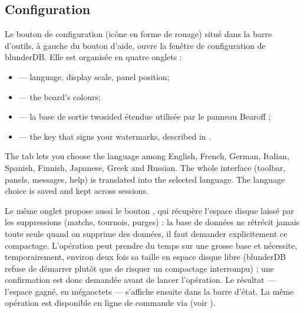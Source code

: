 \documentclass[letterpaper,10pt,english]{sphinxmanual}
\begin{document}
\subsection{Configuration}
\label{\detokenize{manuel:configuration}}\label{\detokenize{manuel:id2}}
\sphinxAtStartPar
Le bouton de configuration (icône en forme de rouage) situé dans la barre
d’outils, à gauche du bouton d’aide, ouvre la fenêtre de configuration de
blunderDB. Elle est organisée en quatre onglets :
\begin{itemize}
\item {} 
\sphinxAtStartPar
{} — language, display scale, panel position;

\item {} 
\sphinxAtStartPar
{} — the board’s colours;

\item {} 
\sphinxAtStartPar
{} — la base de sortie two\sphinxhyphen{}sided étendue utilisée par le panneau
Bearoff ;

\item {} 
\sphinxAtStartPar
{} — the key that signs your watermarks, described in {\hyperref[\detokenize{manuel:diffusion-controlee}]{}}.

\end{itemize}

\sphinxAtStartPar
The  tab lets you choose the language among English, French, German, Italian, Spanish, Finnish, Japanese, Greek and Russian. The whole interface (toolbar, panels, messages, help) is translated into the selected language. The language choice is saved and kept across sessions.

\sphinxAtStartPar
Le même onglet propose aussi le bouton , qui récupère
l’espace disque laissé par les suppressions (matchs, tournois, purges) : la
base de données ne rétrécit jamais toute seule quand on supprime des données,
il faut demander explicitement ce compactage. L’opération peut prendre du
temps sur une grosse base et nécessite, temporairement, environ deux fois sa
taille en espace disque libre (blunderDB refuse de démarrer plutôt que de
risquer un compactage interrompu) ; une confirmation est donc demandée avant
de lancer l’opération. Le résultat — l’espace gagné, en mégaoctets — s’affiche
ensuite dans la barre d’état. La même opération est disponible en ligne de
commande via  (voir {\hyperref[\detokenize{cli:cli}]{}}).
\end{document}
